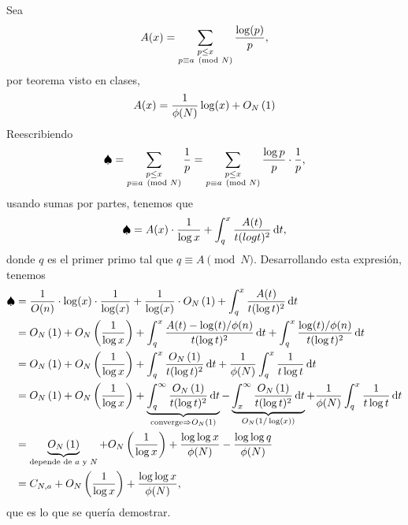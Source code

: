 \begin{sol}
	Sea
	$$A(x) = \ds\sum_{\substack{p \leq x \\ p \equiv a \pmod N}} \frac{\log (p)}{p},$$
	por teorema visto en clases,
	$$A(x) = \frac{1}{\phi(N)} \log (x) + \BigO[N]{1}$$
	Reescribiendo
	$$\spadesuit = \ds\sum_{\substack{p \leq x \\ p \equiv a \pmod N}} \frac{1}{p} = \ds\sum_{\substack{p \leq x \\ p \equiv a \pmod N}} \frac{\log p}{p} \cdot \frac{1}{p},$$
	usando sumas por partes, tenemos que
	$$\spadesuit = A(x) \cdot \frac{1}{\log x} + \int_q^x \frac{A(t)}{t (log t)^2} \d{t},$$
	donde $q$ es el primer primo tal que $q \equiv A \pmod N$. Desarrollando esta expresión, tenemos
	\begin{align*}
		\spadesuit & = \frac{1}{O(n)} \cdot \log (x) \cdot \frac{1}{\log (x)} + \frac{1}{\log (x)} \cdot \BigO[N]{1} + \int_q^x \frac{A(t)}{t (\log t)^2} \d{t}                                                                                                                                                \\
		           & = \BigO[N]{1} + \BigO[N]{ \frac{1}{\log x} } + \int_q^x \frac{A(t) - \log(t)/\phi(n)}{t (\log t)^2} \d{t} + \int_q^x \frac{\log(t)/\phi(n)}{t (\log t)^2} \d{t}                                                                                                                      \\
		           & = \BigO[N]{1} + \BigO[N]{ \frac{1}{\log x} } + \int_q^x \frac{\BigO[N]{1}}{t (\log t)^2} \d{t} + \frac{1}{\phi(N)} \int_q^x \frac{1}{t \log t} \d{t}                                                                                                                                      \\
		           & = \BigO[N]{1} + \BigO[N]{ \frac{1}{\log x} } + \underbrace{\int_q^\infty \frac{\BigO[N]{1}}{t (\log t)^2} \d{t}}_{\text{converge} \Rightarrow \BigO[N]{1}} - \underbrace{\int_x^\infty \frac{\BigO[N]{1}}{t (\log t)^2} \d{t}}_{O_N(1/\log (x))} + \frac{1}{\phi(N)} \int_q^x \frac{1}{t \log t} \d{t} \\
		           & = \underbrace{\BigO[N]{1}}_{\text{depende de } a \text{ y } N} + \BigO[N]{ \frac{1}{\log x} } + \frac{\log \log x}{\phi (N)}  - {\frac{\log \log q}{\phi (N)}}                                                                                                                   \\
		           & = C_{N, a} + \BigO[N]{ \frac{1}{\log x} } + \frac{\log \log x}{\phi(N)},
	\end{align*}
	que es lo que se quería demostrar.
\end{sol}

